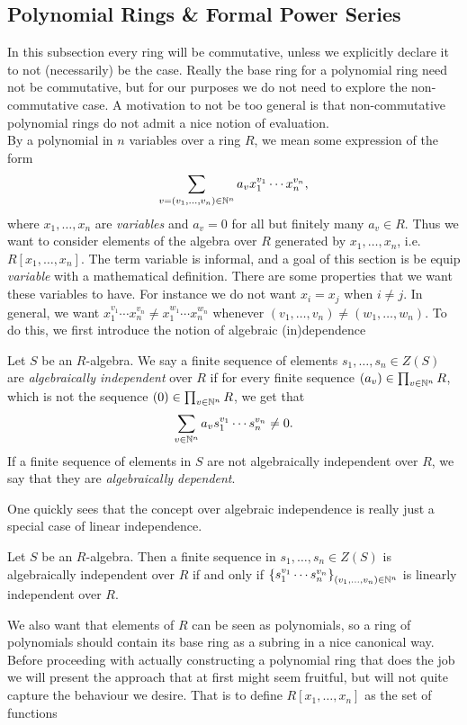 \subsection{Polynomial Rings \& Formal Power Series}
In this subsection every ring will be commutative, unless we explicitly declare it to not (necessarily) be the case. Really the base ring for a polynomial ring need not be commutative, but for our purposes we do not need to explore the non-commutative case. A motivation to not be too general is that non-commutative polynomial rings do not admit a nice notion of evaluation.\\
 By a polynomial in $n$ variables over a ring $R$, we mean some expression of the form 
$$\sum_{v=(v_1,\dots,v_n)\in \mathbb{N}^n} a_vx_1^{v_1}\cdots x_n^{v_n},$$
where $x_1,\dots,x_n$ are \textit{variables} and $a_v = 0$ for all but finitely many $a_v\in R$. Thus we want to consider elements of the algebra over $R$ generated by $x_1,\dots,x_n$, i.e. $R[x_1,\dots,x_n]$. The term variable is informal, and a goal of this section is be equip \emph{variable} with a mathematical definition. There are some properties that we want these variables to have. For instance we do not want $x_i = x_j$ when $i\neq j$. In general, we want $x_1^{v_1}\cdots x_n^{v_n} \neq x_1^{w_1}\cdots x_n^{w_n}$ whenever $(v_1,\dots,v_n)\neq (w_1,\dots,w_n)$. To do this, we first introduce the notion of algebraic (in)dependence
\begin{definition}
    Let $S$ be an $R$-algebra. We say a finite sequence of elements 
    $s_1,\dots,s_n\in Z(S)$ are \textit{algebraically independent} over $R$ if for every 
    finite sequence $(a_v)\in \prod_{v\in \mathbb{N}^n} R$, which is not the sequence $(0)\in \prod_{v\in \mathbb{N}^n} R$, we get that 
    $$\sum_{v\in \mathbb{N}^n} a_v s_1^{v_1}\cdots s_n^{v_n} \neq 0.$$
    If a finite sequence of elements in $S$ are not algebraically independent over $R$, we say that they are \textit{algebraically dependent}. 
\end{definition}
One quickly sees that the concept over algebraic independence is really just a special case of linear independence.
\begin{lemma}\label{AlgebraicallyIndependentIffMonomialsLinearlyIndependent}
    Let $S$ be an $R$-algebra. Then a finite sequence in $s_1,\dots,s_n \in Z(S)$ is algebraically independent over $R$ if and only if $\left\{s_1^{v_1}\cdots s_n^{v_n}\right\}_{(v_1,\dots,v_n)\in \mathbb{N}^n}$ is linearly independent over $R$.
\end{lemma}
We also want that elements of $R$ can be seen as polynomials, so a ring of polynomials should contain its base ring as a subring in a nice canonical way. Before proceeding with actually constructing a polynomial ring that does the job we will present the approach that at first might seem fruitful, but will not quite capture the behaviour we desire. That is to define $R[x_1,\dots,x_n]$ as the set of functions 
